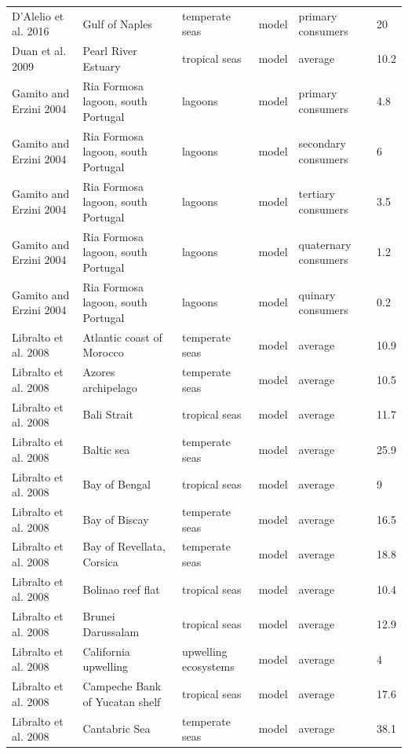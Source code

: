 \documentclass[oneside,12pt,final]{sty/ucthesis-CA2012}
\begin{document}
\begin{mainmatter}
\begin{longtable} {p{4cm}p{3cm}p{2cm}lp{2cm}p{2cm}}
    D'Alelio et al. 2016   & Gulf of Naples & temperate seas & model & primary consumers & 20 \\
    Duan et al. 2009  & Pearl River Estuary & tropical seas & model & average & 10.2 \\
    Gamito and Erzini 2004  & Ria Formosa lagoon, south Portugal & lagoons & model & primary consumers & 4.8 \\
    Gamito and Erzini 2004   & Ria Formosa lagoon, south Portugal & lagoons & model & secondary consumers & 6 \\
    Gamito and Erzini 2004   & Ria Formosa lagoon, south Portugal & lagoons & model & tertiary consumers & 3.5 \\
    Gamito and Erzini 2004   & Ria Formosa lagoon, south Portugal & lagoons & model & quaternary consumers & 1.2 \\
    Gamito and Erzini 2004   & Ria Formosa lagoon, south Portugal & lagoons & model & quinary consumers & 0.2 \\
    Libralto et al. 2008   & Atlantic coast of Morocco  & temperate seas & model & average & 10.9 \\
    Libralto et al. 2008   & Azores archipelago & temperate seas & model & average & 10.5 \\
    Libralto et al. 2008   & Bali Strait & tropical seas & model & average & 11.7 \\
    Libralto et al. 2008   & Baltic sea & temperate seas & model & average & 25.9 \\
    Libralto et al. 2008  & Bay of Bengal & tropical seas & model & average & 9 \\
    Libralto et al. 2008   & Bay of Biscay & temperate seas & model & average & 16.5 \\
    Libralto et al. 2008   & Bay of Revellata, Corsica & temperate seas & model & average & 18.8 \\
    Libralto et al. 2008   & Bolinao reef flat & tropical seas & model & average & 10.4 \\
    Libralto et al. 2008   & Brunei Darussalam & tropical seas & model & average & 12.9 \\
    Libralto et al. 2008  & California upwelling & upwelling ecosystems & model & average & 4 \\
    Libralto et al. 2008  & Campeche Bank of Yucatan shelf & tropical seas & model & average & 17.6 \\
    Libralto et al. 2008   & Cantabric Sea & temperate seas & model & average & 38.1 \\

\end{longtable}
\end{mainmatter}
\end{document}
